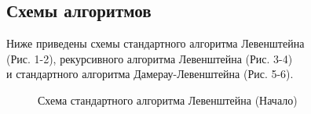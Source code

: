 \documentclass[a4paper,12pt]{article}
\begin{document}
\subsection{Схемы алгоритмов}
Ниже приведены схемы стандартного алгоритма Левенштейна\\(Рис. 1-2), рекурсивного алгоритма Левенштейна (Рис. 3-4)\\ и стандартного алгоритма Дамерау-Левенштейна (Рис. 5-6).\\
\begin{figure}[h!]
\caption{Схема стандартного алгоритма Левенштейна (Начало)}
\label{images:levenstein}
\end{figure}
\end{document}
